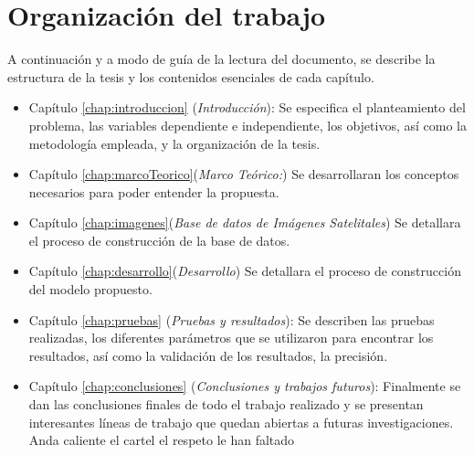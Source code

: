 \section{Organización del trabajo}
A continuación y a modo de guía de la lectura del documento, se describe la estructura de la tesis y los contenidos esenciales de cada capítulo.
\begin{itemize}
\item Capítulo \ref{chap:introduccion} (\textit{Introducción}): Se especifica el planteamiento del problema, las variables dependiente e independiente, los objetivos, así como la metodología empleada, y la organización de la tesis.
\item Capítulo \ref{chap:marcoTeorico}(\textit{Marco Teórico:}) Se desarrollaran los conceptos necesarios para poder entender la propuesta.
\item Capítulo \ref{chap:imagenes}(\textit{Base de datos de Imágenes Satelitales}) Se detallara el proceso de construcción de la base de datos.

\item Capítulo \ref{chap:desarrollo}(\textit{Desarrollo}) Se detallara el proceso de construcción del modelo propuesto.


\item Capítulo \ref{chap:pruebas} (\textit{Pruebas y resultados}): Se describen las pruebas realizadas, los diferentes parámetros que se utilizaron para encontrar los resultados, así como la validación de los resultados, la precisión.
\item Capítulo \ref{chap:conclusiones} (\textit{Conclusiones y trabajos futuros}): Finalmente se dan las conclusiones finales de todo el trabajo realizado y se presentan interesantes líneas de trabajo que quedan abiertas a futuras investigaciones.
Anda caliente el cartel el respeto le han faltado 
\end{itemize}

